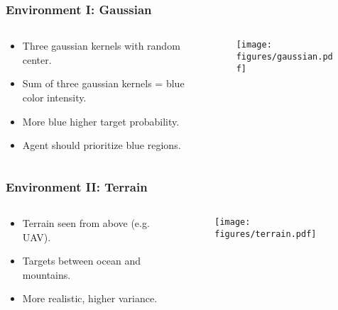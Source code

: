\begin{frame}
    \frametitle{Environment I: Gaussian}
    \begin{columns}
        \begin{column}{0.5\textwidth}
            \begin{itemize}
                \item Three gaussian kernels with random center.
                \item Sum of three gaussian kernels = blue color intensity.
                \item More blue \rightarrow higher target probability.
                \item Agent should prioritize blue regions.
            \end{itemize}
        \end{column}
        \begin{column}{0.5\textwidth}
            \begin{figure}
                \centering
                \texttt{[image: figures/gaussian.pdf]}
            \end{figure}
        \end{column}
    \end{columns}    
\end{frame}

\begin{frame}
    \frametitle{Environment II: Terrain}
    \begin{columns}
        \begin{column}{0.5\textwidth}
            \begin{itemize}
                \item Terrain seen from above (e.g. UAV).
                \item Targets between ocean and mountains.
                \item More realistic, higher variance.
            \end{itemize}
        \end{column}
        \begin{column}{0.5\textwidth}
            \begin{figure}
                \centering
                \texttt{[image: figures/terrain.pdf]}
            \end{figure}
        \end{column}
    \end{columns}   
\end{frame}

